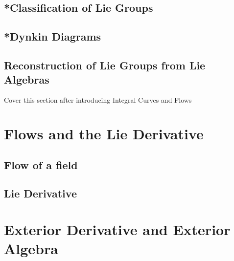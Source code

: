 \documentclass[11pt]{article}
\begin{document}

\subsection{*Classification of Lie Groups}

\subsection{*Dynkin Diagrams}

\subsection{Reconstruction of Lie Groups from Lie Algebras}
\begin{note}
  {Cover this section after introducing Integral Curves and Flows}
\end{note}





\newpage
\section{Flows and the Lie Derivative}

\subsection{Flow of a field}

\subsection{Lie Derivative}


\newpage
\section{Exterior Derivative and Exterior Algebra}
\end{document}
